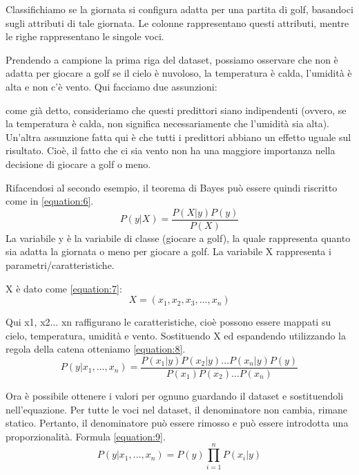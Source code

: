 Classifichiamo se la giornata si configura adatta per una partita di golf, basandoci sugli attributi di tale giornata. Le colonne rappresentano questi attributi, mentre le righe rappresentano le singole voci.

Prendendo a campione la prima riga del dataset, possiamo osservare che non è adatta per giocare a golf se il cielo è nuvoloso, la temperatura è calda, l'umidità è alta e non c'è vento. Qui facciamo due assunzioni: 

come già detto, consideriamo che questi predittori siano indipendenti (ovvero, se la temperatura è calda, non significa necessariamente che l'umidità sia alta). Un'altra assunzione fatta qui è che tutti i predittori abbiano un eﬀetto uguale sul risultato. Cioè, il fatto che ci sia vento non ha una maggiore importanza nella  decisione di giocare a golf o meno. 

Rifacendosi al secondo esempio, il teorema di Bayes può essere quindi riscritto come in \ref{equation:6}.
\begin{equation}
    P(y|X) = \frac{{P(X|y)P(y)}}{{P(X)}}
    \label{equation:6}
\end{equation}
La variabile y è la variabile di classe (giocare a golf), la quale rappresenta quanto sia adatta la giornata o meno per giocare a golf. La variabile X rappresenta i parametri/caratteristiche.

X è dato come \ref{equation:7}:
\begin{equation}
    X = (x_1, x_2, x_3, \ldots, x_n)
    \label{equation:7}
\end{equation}


Qui x1, x2... xn raffigurano le caratteristiche, cioè possono essere mappati su cielo, temperatura, umidità e vento. Sostituendo X ed espandendo utilizzando la regola della catena otteniamo \ref{equation:8}.
\begin{equation}
    P(y|x_1,\ldots,x_n) = \frac{{P(x_1|y)P(x_2|y)\ldots P(x_n|y)P(y)}}{{P(x_1)P(x_2)\ldots P(x_n)}}
    \label{equation:8}
\end{equation}

Ora è possibile ottenere i valori per ognuno guardando il dataset e sostituendoli nell'equazione. Per tutte le voci nel dataset, il denominatore non cambia, rimane statico. Pertanto, il denominatore può essere rimosso e può essere introdotta una proporzionalità. Formula \ref{equation:9}.
\begin{equation}
    P(y|x_1,\ldots,x_n) = P(y) \prod_{i=1}^{n} P(x_i|y)
    \label{equation:9}
\end{equation}

